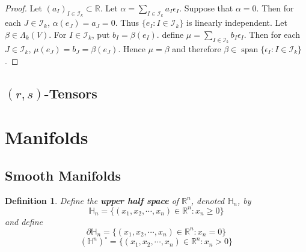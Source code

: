 \documentclass[12pt]{amsart}
\newtheorem{defn}[thm]{Definition}
\newcommand{\al}{\alpha}
\newcommand{\bet}{\beta}
\newcommand{\Lam}{\Lambda}
\newcommand{\ep}{\epsilon}
\renewcommand{\H}{\mathbb{H}}
\newcommand{\R}{\mathbb{R}}
\newcommand{\MI}{\mathcal{I}}
\DeclareMathOperator{\spn}{span}
\begin{document}
	\begin{proof}
		Let $(a_I)_{I \in \MI_k} \subset \R$. Let $\al = \sum_{I \in \MI_k}a_I \ep_I$. Suppose that $\al = 0$. Then for each $J \in \MI_k$, $\al(e_J) = a_J = 0$. Thus $\{e_I: I \in \MI_k\}$ is linearly independent. Let $\bet \in \Lam_k(V)$. For $I \in \MI_k$, put $b_I = \bet(e_I)$. define $\mu = \sum_{I \in \MI_k} b_I\ep_I$. Then for each $J \in \MI_k$, $\mu(e_J) = b_J = \bet(e_J)$. Hence $\mu = \bet$ and therefore $\bet \in \spn \{\ep_I:I \in \MI_k\}$.
	\end{proof}
	
	
	
	
	
	
	
	
	
	
	
	
	
	
	
	\newpage
	
	\subsection{$(r,s)$-Tensors}
	
	
	
	
	
	
	
	
	
	
	
	
	
	
	
	
	
	
	
	
	
	
	
	
	
	
	
	
	
	
	

	\newpage
	
	\section{Manifolds}
	
	\subsection{Smooth Manifolds}
	
	\begin{defn}
		Define the \textbf{upper half space} of $\R^n$, denoted $\H_n$, by $$\H_n = \{(x_1, x_2, \cdots, x_n) \in \R^n: x_n \geq 0\}$$ and define $$\partial\H_n = \{(x_1, x_2, \cdots, x_n) \in \R^n: x_n = 0\}$$ 
		$$(\H^n)^{\circ} = \{(x_1, x_2, \cdots, x_n) \in \R^n: x_n > 0\}$$
	\end{defn}
	
\end{document}
